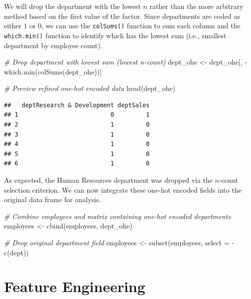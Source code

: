 \documentclass[
]{book}
\newenvironment{Shaded}{\begin{snugshade}}{\end{snugshade}}
\newcommand{\AttributeTok}[1]{\textcolor[rgb]{0.77,0.63,0.00}{#1}}
\newcommand{\CommentTok}[1]{\textcolor[rgb]{0.56,0.35,0.01}{\textit{#1}}}
\newcommand{\FunctionTok}[1]{\textcolor[rgb]{0.00,0.00,0.00}{#1}}
\newcommand{\NormalTok}[1]{#1}
\newcommand{\OtherTok}[1]{\textcolor[rgb]{0.56,0.35,0.01}{#1}}
\newcommand{\SpecialCharTok}[1]{\textcolor[rgb]{0.00,0.00,0.00}{#1}}
\begin{document}
We will drop the department with the lowest \(n\) rather than the more arbitrary method based on the first value of the factor. Since departments are coded as either \(1\) or \(0\), we can use the \texttt{colSums()} function to sum each column and the \texttt{which.min()} function to identify which has the lowest sum (i.e., smallest department by employee count).

\begin{Shaded}
\begin{Highlighting}[]
\CommentTok{\# Drop department with lowest sum (lowest n{-}count)}
\NormalTok{dept\_ohe }\OtherTok{\textless{}{-}}\NormalTok{ dept\_ohe[, }\SpecialCharTok{{-}}\FunctionTok{which.min}\NormalTok{(}\FunctionTok{colSums}\NormalTok{(dept\_ohe))]}

\CommentTok{\# Preview refined one{-}hot encoded data}
\FunctionTok{head}\NormalTok{(dept\_ohe)}
\end{Highlighting}
\end{Shaded}

\begin{verbatim}
##   deptResearch & Development deptSales
## 1                          0         1
## 2                          1         0
## 3                          1         0
## 4                          1         0
## 5                          1         0
## 6                          1         0
\end{verbatim}

As expected, the Human Resources department was dropped via the \(n\)-count selection criterion. We can now integrate these one-hot encoded fields into the original data frame for analysis.

\begin{Shaded}
\begin{Highlighting}[]
\CommentTok{\# Combine employees and matrix containing one{-}hot encoded departments}
\NormalTok{employees }\OtherTok{\textless{}{-}} \FunctionTok{cbind}\NormalTok{(employees, dept\_ohe)}

\CommentTok{\# Drop original department field}
\NormalTok{employees }\OtherTok{\textless{}{-}} \FunctionTok{subset}\NormalTok{(employees, }\AttributeTok{select =} \SpecialCharTok{{-}}\FunctionTok{c}\NormalTok{(dept))}
\end{Highlighting}
\end{Shaded}

\hypertarget{feature-engineering}{%
\section{Feature Engineering}\label{feature-engineering}}
\end{document}
